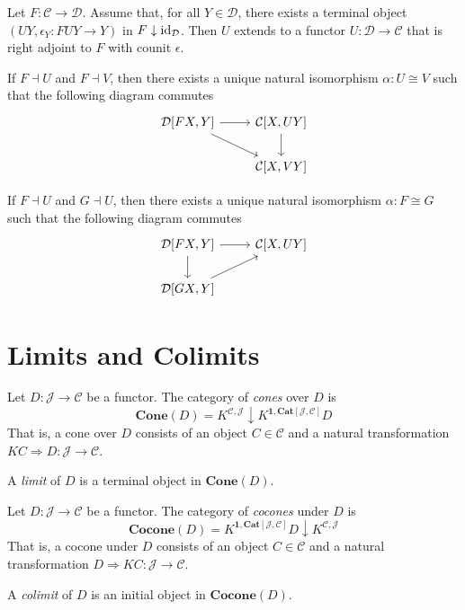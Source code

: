 \begin{prop}
Let $F : \mathcal{C} \rightarrow \mathcal{D}$. Assume that, for all $Y \in \mathcal{D}$, there exists a terminal object $(UY, \epsilon_Y : FUY \rightarrow Y)$ in $F \downarrow \mathrm{id}_{\mathcal{D}}$. Then $U$ extends to a functor $U : \mathcal{D} \rightarrow \mathcal{C}$ that is right adjoint to $F$ with counit $\epsilon$.
\end{prop}

\begin{prop}
If $F \dashv U$ and $F \dashv V$, then there exists a unique natural isomorphism $\alpha : U \cong V$ such that the following diagram commutes
\[ \begin{tikzcd}
\mathcal{D}[FX,Y] \arrow[r] \arrow[dr] & \mathcal{C}[X,UY] \arrow[d] \\
& \mathcal{C}[X,VY] 
\end{tikzcd}
\]
\end{prop}

\begin{prop}
If $F \dashv U$ and $G \dashv U$, then there exists a unique natural isomorphism $\alpha : F \cong G$ such that the following diagram commutes
\[ \begin{tikzcd}
\mathcal{D}[FX,Y] \arrow[r] \arrow[d] & \mathcal{C}[X,UY] \\
\mathcal{D}[GX,Y] \arrow[ur]
\end{tikzcd}
\]
\end{prop}

\chapter{Limits and Colimits}

\begin{df}[Limit]
Let $D : \mathcal{J} \rightarrow \mathcal{C}$ be a functor. The category of \emph{cones} over $D$ is
\[ \mathbf{Cone}(D) = K^\mathcal{\mathcal{C},\mathcal{J}} \downarrow K^{\mathbf{1},\mathbf{Cat}[\mathcal{J},\mathcal{C}]}D \]
That is, a cone over $D$ consists of an object $C \in \mathcal{C}$ and a natural transformation $KC \Rightarrow D : \mathcal{J} \rightarrow \mathcal{C}$.

A \emph{limit} of $D$ is a terminal object in $\mathbf{Cone}(D)$.
\end{df}

\begin{df}[Colimit]
Let $D : \mathcal{J} \rightarrow \mathcal{C}$ be a functor. The category of \emph{cocones} under $D$ is
\[ \mathbf{Cocone}(D) = K^{\mathbf{1},\mathbf{Cat}[\mathcal{J},\mathcal{C}]}D \downarrow K^\mathcal{\mathcal{C},\mathcal{J}} \]
That is, a cocone under $D$ consists of an object $C \in \mathcal{C}$ and a natural transformation $D \Rightarrow KC : \mathcal{J} \rightarrow \mathcal{C}$.

A \emph{colimit} of $D$ is an initial object in $\mathbf{Cocone}(D)$.
\end{df}

